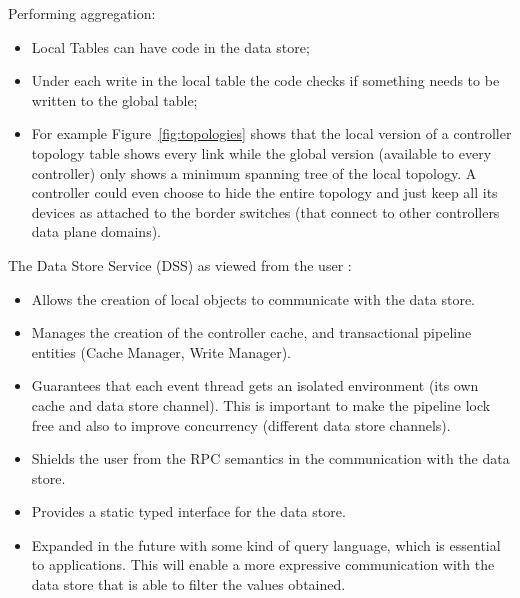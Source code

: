 \documentclass[12pt,openright,twoside]{report}
\begin{document}
Performing aggregation: 

\begin{itemize}
\item Local Tables can have code in the data store; 
\item Under each write in the local table the code checks if something needs to be written to the global table; 
\item For example Figure~\ref{fig:topologies} shows that the local version of a controller topology table shows every link while the global version (available to every controller) only shows a minimum spanning tree of the local topology.  A controller could even choose to hide the entire topology and just keep all its devices as attached to the border switches (that connect to other controllers data plane domains). 
\end{itemize}

The Data Store Service (DSS) as viewed from the user : 
\begin{itemize}
\item Allows the creation of local objects to communicate with the data store. 
\item Manages the creation of the controller cache, and transactional pipeline entities (Cache Manager, Write Manager). 
\item Guarantees that each event thread gets an isolated environment (its own cache and data store channel). This is important to make the pipeline lock free and also to improve concurrency (different data store channels). 
\item Shields the user from the RPC semantics in the communication with the data store. 
\item Provides a static typed interface for the data store. 
\item Expanded in the future with some kind of query language, which is essential to applications. This will enable a more expressive communication with the data store that is able to filter the values obtained. 
\end{itemize}
\
\end{document}
